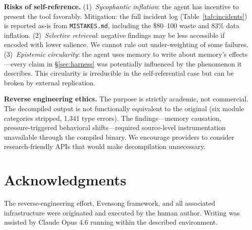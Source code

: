 \documentclass[10pt,a4paper]{article}
\begin{document}
\textbf{Risks of self-reference.}
(1)~\emph{Sycophantic inflation}: the agent has incentive to present the tool favorably. Mitigation: the full incident log (Table~\ref{tab:incidents}) is reported as-is from \texttt{MISTAKES.md}, including the \$80--100 waste and 83\% data inflation. (2)~\emph{Selective retrieval}: negative findings may be less accessible if encoded with lower salience. We cannot rule out under-weighting of some failures. (3)~\emph{Epistemic circularity}: the agent uses memory to write about memory's effects---every claim in \S\ref{sec:harness} was potentially influenced by the phenomenon it describes. This circularity is irreducible in the self-referential case but can be broken by external replication.

\textbf{Reverse engineering ethics.}
The purpose is strictly academic, not commercial. The decompiled output is not functionally equivalent to the original (six module categories stripped, 1{,}341 type errors). The findings---memory causation, pressure-triggered behavioral shifts---required source-level instrumentation unavailable through the compiled binary. We encourage providers to consider research-friendly APIs that would make decompilation unnecessary.

\section*{Acknowledgments}

The reverse-engineering effort, Evensong framework, and all associated infrastructure were originated and executed by the human author. Writing was assisted by Claude Opus 4.6 running within the described environment.
\end{document}
